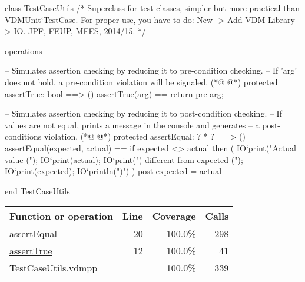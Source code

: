 \begin{vdmpp}
class TestCaseUtils
/*
  Superclass for test classes, simpler but more practical than VDMUnit`TestCase. 
  For proper use, you have to do: New -> Add VDM Library -> IO.
  JPF, FEUP, MFES, 2014/15.
*/

operations

 -- Simulates assertion checking by reducing it to pre-condition checking.
 -- If 'arg' does not hold, a pre-condition violation will be signaled.
(*@
\label{assertTrue:12}
@*)
 protected assertTrue: bool ==> ()
 assertTrue(arg) == 
  return 
 pre arg;
  
 -- Simulates assertion checking by reducing it to post-condition checking.
 -- If values are not equal, prints a message in the console and generates 
 -- a post-conditions violation.
(*@
\label{assertEqual:20}
@*)
 protected assertEqual: ? * ? ==> ()
 assertEqual(expected, actual) == 
  if expected <> actual then (
    IO`print("Actual value (");
    IO`print(actual); 
    IO`print(") different from expected (");
    IO`print(expected);
    IO`println(")\n")
  )
 post expected = actual
  
end TestCaseUtils
\end{vdmpp}
\bigskip
\begin{longtable}{|l|r|r|r|}
\hline
Function or operation & Line & Coverage & Calls \\
\hline
\hline
\hyperref[assertEqual:20]{assertEqual} & 20&100.0\% & 298 \\
\hline
\hyperref[assertTrue:12]{assertTrue} & 12&100.0\% & 41 \\
\hline
\hline
TestCaseUtils.vdmpp & & 100.0\% & 339 \\
\hline
\end{longtable}

